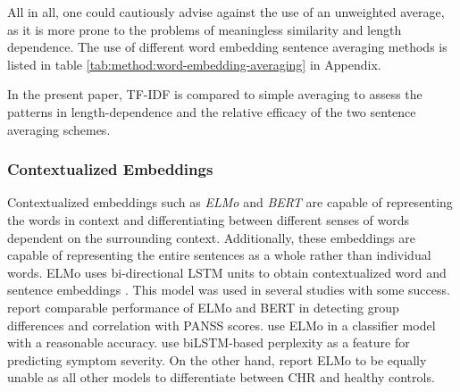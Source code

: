 All in all, one could cautiously advise against the use of an unweighted average, as it is more prone to the problems of meaningless similarity and length dependence. The use of different word embedding sentence averaging methods is listed in table \ref{tab:method:word-embedding-averaging} in Appendix.

In the present paper, TF-IDF is compared to simple averaging to assess the patterns in length-dependence and the relative efficacy of the two sentence averaging schemes.

\subsubsection{Contextualized Embeddings}

Contextualized embeddings such as \textit{ELMo} and \textit{BERT} are capable of representing the words in context and differentiating between different senses of words dependent on the surrounding context. Additionally, these embeddings are capable of representing the entire sentences as a whole rather than individual words. ELMo uses bi-directional LSTM units to obtain contextualized word and sentence embeddings \citep{peters2017semi}. This model was used in several studies with some success. \citet{ryazanskaya2020thesis} report comparable performance of ELMo and BERT in detecting group differences and correlation with PANSS scores. \citet{sarzynska2021detecting} use ELMo in a classifier model with a reasonable %
accuracy. \citet{srivastava2022increased} use biLSTM-based perplexity as a feature for predicting symptom severity. On the other hand, \citet{hitczenko2021understanding} report ELMo to be equally unable as all other models to differentiate between CHR and healthy controls.

